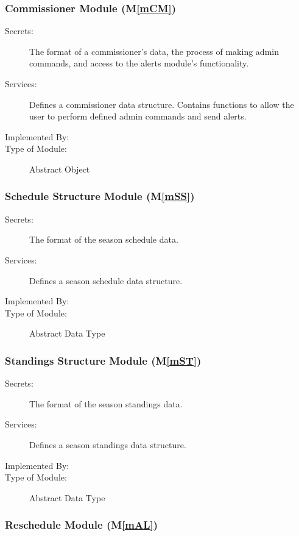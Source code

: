 \documentclass[12pt, titlepage]{article}
\newcommand{\mref}[1]{M\ref{#1}}
\begin{document}
\subsubsection{Commissioner Module (\mref{mCM})}

\begin{description}
\item[Secrets:]The format of a commissioner's data, the process of making
admin commands, and access to the alerts module's functionality.
\item[Services:]Defines a commissioner data structure. Contains functions to allow
the user to perform defined admin commands and send alerts.
\item[Implemented By:] \progname{}
\item[Type of Module:] Abstract Object
\end{description}

\subsubsection{Schedule Structure Module (\mref{mSS})}

\begin{description}
\item[Secrets:]The format of the season schedule data.
\item[Services:]Defines a season schedule data structure.
\item[Implemented By:] \progname{}
\item[Type of Module:] Abstract Data Type
\end{description}

\subsubsection{Standings Structure Module (\mref{mST})}

\begin{description}
\item[Secrets:]The format of the season standings data.
\item[Services:]Defines a season standings data structure.
\item[Implemented By:] \progname{}
\item[Type of Module:] Abstract Data Type
\end{description}

\subsubsection{Reschedule Module (\mref{mAL})}
\end{document}
